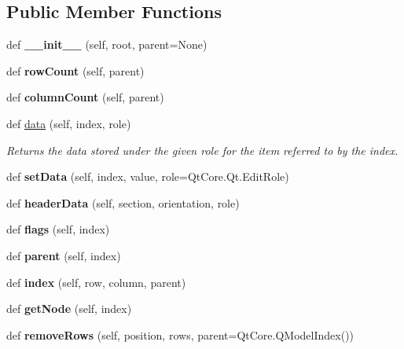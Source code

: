 \subsection*{Public Member Functions}
\begin{DoxyCompactItemize}
\item 
\hypertarget{a00085_a7961b552537902b9236c2ded9cbfbc63}{}\label{a00085_a7961b552537902b9236c2ded9cbfbc63} 
def {\bfseries \+\_\+\+\_\+init\+\_\+\+\_\+} (self, root, parent=None)
\item 
\hypertarget{a00085_a44b390eef57be2a4883c1e6599b5a8ca}{}\label{a00085_a44b390eef57be2a4883c1e6599b5a8ca} 
def {\bfseries row\+Count} (self, parent)
\item 
\hypertarget{a00085_a132b1b7d95f07cae505b40b7fdeb4545}{}\label{a00085_a132b1b7d95f07cae505b40b7fdeb4545} 
def {\bfseries column\+Count} (self, parent)
\item 
\hypertarget{a00085_a2f7291849d0efb3d7cff499d1cde0bf6}{}\label{a00085_a2f7291849d0efb3d7cff499d1cde0bf6} 
def \hyperlink{a00085_a2f7291849d0efb3d7cff499d1cde0bf6}{data} (self, index, role)
\begin{DoxyCompactList}\small\item\em Returns the data stored under the given role for the item referred to by the index. \end{DoxyCompactList}\item 
\hypertarget{a00085_a9d7790fb94587e15b2c1b77a01e7845c}{}\label{a00085_a9d7790fb94587e15b2c1b77a01e7845c} 
def {\bfseries set\+Data} (self, index, value, role=Qt\+Core.\+Qt.\+Edit\+Role)
\item 
\hypertarget{a00085_a6a1656f6697b334ba6112c194cf04611}{}\label{a00085_a6a1656f6697b334ba6112c194cf04611} 
def {\bfseries header\+Data} (self, section, orientation, role)
\item 
\hypertarget{a00085_ad60d9395ff571be3fcf12411886f8bcf}{}\label{a00085_ad60d9395ff571be3fcf12411886f8bcf} 
def {\bfseries flags} (self, index)
\item 
\hypertarget{a00085_afa98c784f58d15bdb49c9ba85854ae03}{}\label{a00085_afa98c784f58d15bdb49c9ba85854ae03} 
def {\bfseries parent} (self, index)
\item 
\hypertarget{a00085_a3c52ee6daea1dc2ce7bb23833c761ed2}{}\label{a00085_a3c52ee6daea1dc2ce7bb23833c761ed2} 
def {\bfseries index} (self, row, column, parent)
\item 
\hypertarget{a00085_ad19222ac3eb114c51dce157ae50b2e19}{}\label{a00085_ad19222ac3eb114c51dce157ae50b2e19} 
def {\bfseries get\+Node} (self, index)
\item 
\hypertarget{a00085_aa80631169f93be117b17729ae8fa7bf6}{}\label{a00085_aa80631169f93be117b17729ae8fa7bf6} 
def {\bfseries remove\+Rows} (self, position, rows, parent=Qt\+Core.\+Q\+Model\+Index())
\end{DoxyCompactItemize}


